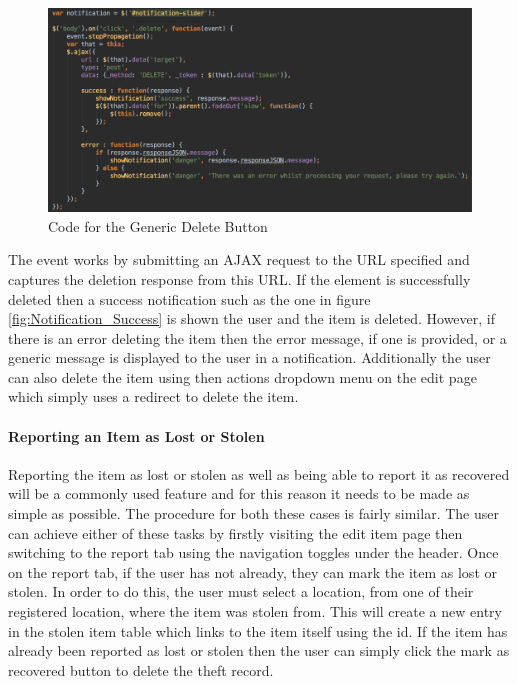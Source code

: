 \begin{figure}[H]
	\centering
	\includegraphics[width=1.0\textwidth]{images/Code/Generic_Delete}
	\caption{Code for the Generic Delete Button} \label{fig:Generic_Delete}
\end{figure}

The event works by submitting an AJAX request to the URL specified and captures the deletion response from this URL. If the element is successfully deleted then a success notification such as the one in figure \ref{fig:Notification_Success} is shown the user and the item is deleted. However, if there is an error deleting the item then the error message, if one is provided, or a generic message is displayed to the user in a notification. Additionally the user can also delete the item using then actions dropdown menu on the edit page which simply uses a redirect to delete the item.

\paragraph{Reporting an Item as Lost or Stolen}
Reporting the item as lost or stolen as well as being able to report it as recovered will be a commonly used feature and for this reason it needs to be made as simple as possible. The procedure for both these cases is fairly similar. The user can achieve either of these tasks by firstly visiting the edit item page then switching to the report tab using the navigation toggles under the header. Once on the report tab, if the user has not already, they can mark the item as lost or stolen. In order to do this, the user must select a location, from one of their registered location, where the item was stolen from. This will create a new entry in the stolen item table which links to the item itself using the id. If the item has already been reported as lost or stolen then the user can simply click the mark as recovered button to delete the theft record.

